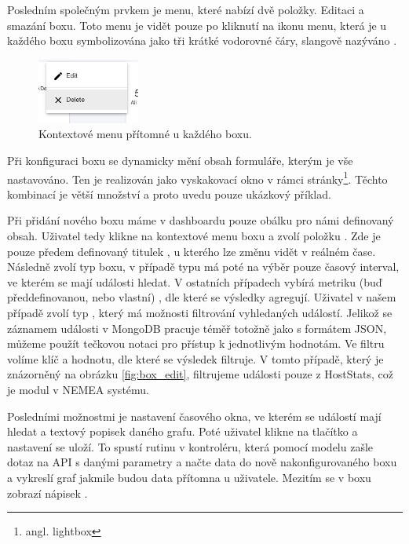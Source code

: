 Posledním společným prvkem je menu, které nabízí dvě položky. Editaci a smazání boxu. Toto menu je vidět pouze po kliknutí na ikonu menu, která je u každého boxu symbolizována jako tři krátké vodorovné čáry, slangově nazýváno .

\begin{figure}[ht]
    \centering
    \includegraphics[width=0.3\textwidth]{fig/box_menu.png}
    \caption{Kontextové menu přítomné u každého boxu.} \label{fig:box_menu}
\end{figure}

Při konfiguraci boxu se dynamicky mění obsah formuláře, kterým je vše nastavováno. Ten je realizován jako vyskakovací okno v rámci stránky\footnote{angl. lightbox}. Těchto kombinací je větší množství a proto uvedu pouze ukázkový příklad.

Při přidání nového boxu máme v dashboardu pouze obálku pro námi definovaný obsah. Uživatel tedy klikne na kontextové menu boxu a zvolí položku . Zde je pouze předem definovaný titulek , u kterého lze změnu vidět v reálném čase. Následně zvolí typ boxu, v případě typu  má poté na výběr pouze časový interval, ve kterém se mají události hledat. V ostatních případech vybírá metriku (buď předdefinovanou, nebo vlastní) , dle které se výsledky agregují. Uživatel v našem případě zvolí typ , který má možnosti filtrování vyhledaných událostí. Jelikož se záznamem události v MongoDB pracuje téměř totožně jako s formátem JSON, můžeme použít tečkovou notaci pro přístup k jednotlivým hodnotám. Ve filtru volíme klíč a hodnotu, dle které se výsledek filtruje. V tomto případě, který je znázorněný na obrázku \ref{fig:box_edit}, filtrujeme události pouze z HostStats, což je modul v NEMEA systému.

Posledními možnostmi je nastavení časového okna, ve kterém se událostí mají hledat a textový popisek daného grafu. Poté uživatel klikne na tlačítko  a nastavení se uloží. To spustí rutinu v kontroléru, která pomocí modelu zašle dotaz na API s danými parametry a načte data do nově nakonfigurovaného boxu a vykreslí graf jakmile budou data přítomna u uživatele. Mezitím se v boxu zobrazí nápisek .

